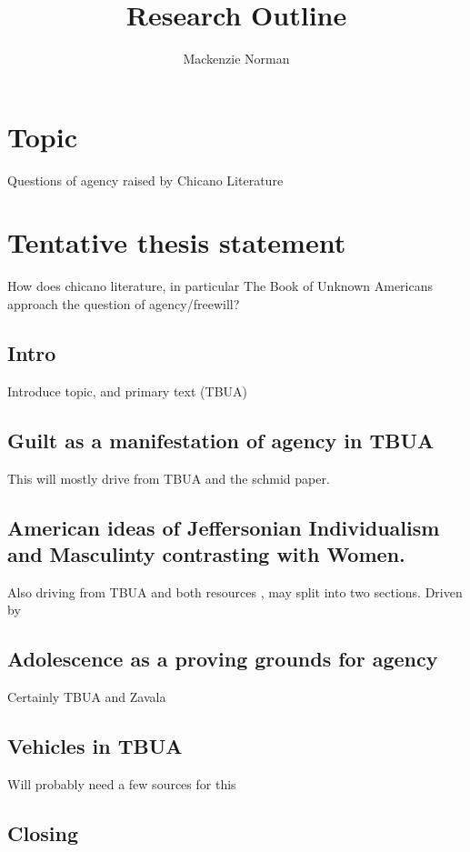 \documentclass{article}
\title{Research Outline}
\author{Mackenzie Norman}
\begin{document}
\maketitle

\section*{Topic} Questions of agency raised by Chicano Literature

\section*{Tentative thesis statement} 

How does chicano literature, in particular The Book of Unknown Americans approach the question of agency/freewill\cite{Henriquez2014-sh}?
\subsection*{Intro}
Introduce topic, and primary text (TBUA)
\subsection*{Guilt as a manifestation of agency in TBUA}
This will mostly drive from TBUA and the schmid paper. \cite{schmid_2016_depiction}
\subsection*{American ideas of Jeffersonian Individualism and Masculinty contrasting with Women.}
Also driving from TBUA and both resources , may split into two sections. Driven by \cite{zavala_2018_adolescent} \cite{schmid_2016_depiction}
\subsection*{Adolescence as a proving grounds for agency}
Certainly TBUA and Zavala\cite{zavala_2018_adolescent}

\subsection*{Vehicles in TBUA}
Will probably need a few sources for this
\subsection*{Closing}

\printbibliography
\end{document}
